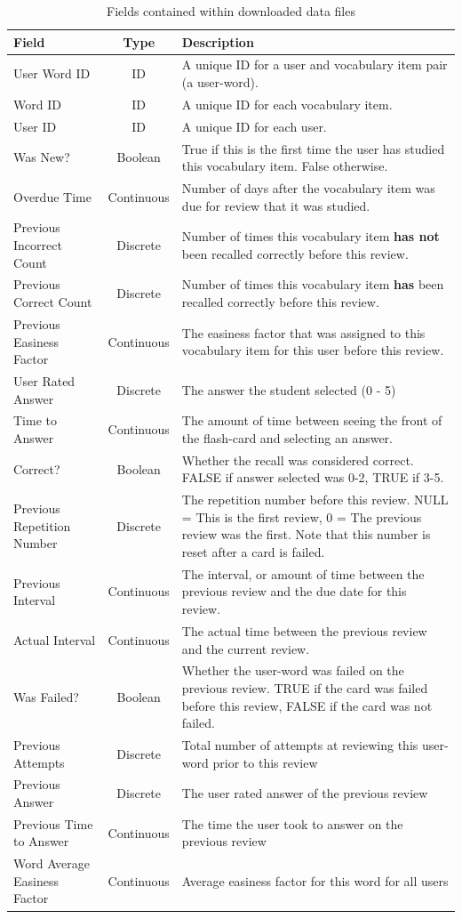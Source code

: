 \begin{table}
\caption{Fields contained within downloaded data files}
\label{tbl_csvfields}
\begin{tabular}{|p{4cm}|c|p{9cm}|}
\hline
Field & Type & Description \\
\hline
User Word ID  & ID & A unique ID for a user and vocabulary item pair (a user-word). \\
Word ID  & ID & A unique ID for each vocabulary item. \\
User ID  & ID & A unique ID for each user. \\
Was New? & Boolean & True if this is the first time the user has studied this vocabulary item. False otherwise. \\
Overdue Time & Continuous & Number of days after the vocabulary item was due for review that it was studied.\\
Previous Incorrect Count & Discrete & Number of times this vocabulary item \textbf{has not} been recalled correctly before this review. \\
Previous Correct Count & Discrete & Number of times this vocabulary item \textbf{has} been recalled correctly before this review. \\
Previous Easiness Factor & Continuous & The easiness factor that was assigned to this vocabulary item for this user before this review. \\
User Rated Answer & Discrete & The answer the student selected (0 - 5) \\
Time to Answer & Continuous & The amount of time between seeing the front of the flash-card and selecting an answer. \\
Correct? & Boolean & Whether the recall was considered correct. FALSE if answer selected was 0-2, TRUE if 3-5. \\
Previous Repetition Number & Discrete & The repetition number before this review. NULL = This is the first review, 0 = The previous review was the first. Note that this number is reset after a card is failed. \\
Previous Interval  & Continuous & The interval, or amount of time between the previous review and the due date for this review. \\
Actual Interval & Continuous & The actual time between the previous review and the current review.\\
Was Failed? & Boolean & Whether the user-word was failed on the previous review. TRUE if the card was failed before this review, FALSE if the card was not failed.\\
Previous Attempts & Discrete & Total number of attempts at reviewing this user-word prior to this review \\
Previous Answer & Discrete & The user rated answer of the previous review \\
Previous Time to Answer & Continuous & The time the user took to answer on the previous review\\
Word Average Easiness Factor & Continuous & Average easiness factor for this word for all users\\
\hline
\end{tabular}
\vspace*{4cm}
\end{table}

